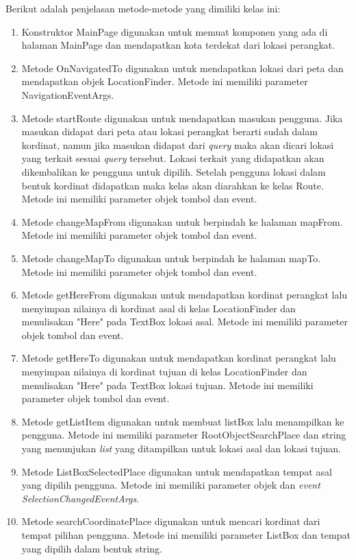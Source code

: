 Berikut adalah penjelasan metode-metode yang dimiliki kelas ini:
\begin{enumerate}
	\item Konstruktor MainPage digunakan untuk memuat komponen yang ada di halaman MainPage dan mendapatkan kota terdekat dari lokasi perangkat.
	\item Metode OnNavigatedTo digunakan untuk mendapatkan lokasi dari peta dan mendapatkan objek LocationFinder. Metode ini memiliki parameter NavigationEventArgs.
	\item Metode startRoute digunakan untuk mendapatkan masukan pengguna. Jika masukan didapat dari peta atau lokasi perangkat berarti sudah dalam kordinat, namun jika masukan didapat dari \textit{query} maka akan dicari lokasi yang terkait sesuai \textit{query} tersebut. Lokasi terkait yang didapatkan akan dikembalikan ke pengguna untuk dipilih. Setelah pengguna lokasi dalam bentuk kordinat didapatkan maka kelas akan diarahkan ke kelas Route. Metode ini memiliki parameter objek tombol dan event.
	\item Metode changeMapFrom digunakan untuk berpindah ke halaman mapFrom. Metode ini memiliki parameter objek tombol dan event.
	\item Metode changeMapTo digunakan untuk berpindah ke halaman mapTo. Metode ini memiliki parameter objek tombol dan event.
	\item Metode getHereFrom digunakan untuk mendapatkan kordinat perangkat lalu menyimpan nilainya di kordinat asal di kelas LocationFinder dan menulisakan "Here" pada TextBox lokasi asal. Metode ini memiliki parameter objek tombol dan event.
	\item Metode getHereTo digunakan untuk mendapatkan kordinat perangkat lalu menyimpan nilainya di kordinat tujuan di kelas LocationFinder dan menulisakan "Here" pada TextBox lokasi tujuan. Metode ini memiliki parameter objek tombol dan event.
	\item Metode getListItem digunakan untuk membuat listBox lalu menampilkan ke pengguna. Metode ini memiliki parameter RootObjectSearchPlace dan string yang menunjukan \textit{list} yang ditampilkan untuk lokasi asal dan lokasi tujuan. 
	\item Metode ListBoxSelectedPlace digunakan untuk mendapatkan tempat asal yang dipilih pengguna. Metode ini memiliki parameter objek dan \textit{event SelectionChangedEventArgs}. 
	\item Metode searchCoordinatePlace digunakan untuk mencari kordinat dari tempat pilihan pengguna. Metode ini memiliki parameter ListBox dan tempat yang dipilih dalam bentuk string.

\end{enumerate}
